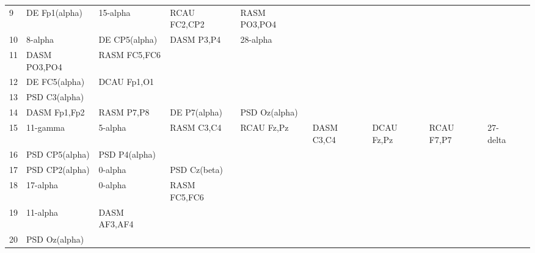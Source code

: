\begin{landscape}
\begin{table}[]
\begin{tabular}{l|llllllll}
9        & DE Fp1(alpha)  & 15-alpha       & RCAU FC2,CP2   & RASM PO3,PO4   &                &                &                &                &               &              \\
10       & 8-alpha        & DE CP5(alpha)  & DASM P3,P4     & 28-alpha       &                &                &                &                &               &              \\
11       & DASM PO3,PO4   & RASM FC5,FC6   &                &                &                &                &                &                &               &              \\
12       & DE FC5(alpha)  & DCAU Fp1,O1    &                &                &                &                &                &                &               &              \\
13       & PSD C3(alpha)  &                &                &                &                &                &                &                &               &              \\
14       & DASM Fp1,Fp2   & RASM P7,P8     & DE P7(alpha)   & PSD Oz(alpha)  &                &                &                &                &               &              \\
15       & 11-gamma       & 5-alpha        & RASM C3,C4     & RCAU Fz,Pz     & DASM C3,C4     & DCAU Fz,Pz     & RCAU F7,P7     & 27-delta       &               &              \\
16       & PSD CP5(alpha) & PSD P4(alpha)  &                &                &                &                &                &                &               &              \\
17       & PSD CP2(alpha) & 0-alpha        & PSD Cz(beta)   &                &                &                &                &                &               &              \\
18       & 17-alpha       & 0-alpha        & RASM FC5,FC6   &                &                &                &                &                &               &              \\
19       & 11-alpha       & DASM AF3,AF4   &                &                &                &                &                &                &               &              \\
20       & PSD Oz(alpha)  &                &                &                &                &                &                &                &               &              \\

\end{tabular}
\end{table}
\end{landscape}
